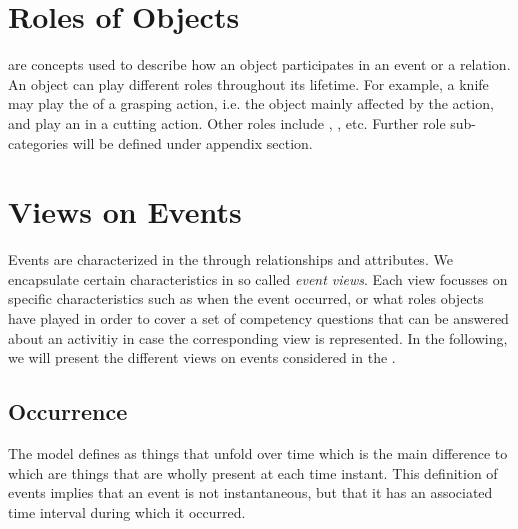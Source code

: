 \section{Roles of Objects}
\label{sec:narrative:roles}

 are concepts used to describe how an object participates in an event or a relation. An object can play different roles throughout its lifetime. For example, a knife may play the  of a grasping action, i.e. the object mainly affected by the action, and play an  in a cutting action. Other roles include , , %
etc. Further role sub-categories will be defined under appendix section. 


\section{Views on Events}
\label{sec:narrative:relations}

Events are characterized in the \neemnar through relationships and attributes.
We encapsulate certain characteristics in so called \emph{event views}.
Each view focusses on specific characteristics such as when the event occurred, or what roles objects have played in order to cover a set of competency questions that can be answered about an activitiy in case the corresponding view is represented.
In the following, we will present the different views on events considered in the \neemnar.


\subsection{Occurrence}
\label{sec:occurrences}
The \neem model defines  as things that unfold over time which is the main difference to  which are things that are wholly present at each time instant.
This definition of events implies that an event is not instantaneous, but that it has an associated time interval during which it occurred.

